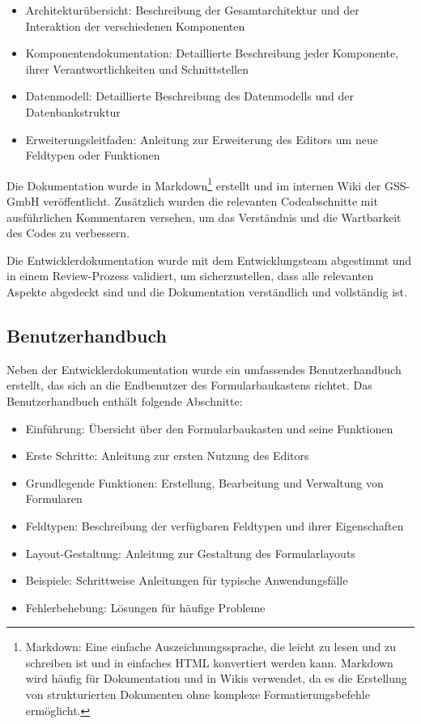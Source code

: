 \documentclass[a4paper,11pt]{article}
\begin{document}
\begin{itemize}
  \item Architekturübersicht: Beschreibung der Gesamtarchitektur und der Interaktion der verschiedenen Komponenten
  \item Komponentendokumentation: Detaillierte Beschreibung jeder Komponente, ihrer Verantwortlichkeiten und Schnittstellen
  \item Datenmodell: Detaillierte Beschreibung des Datenmodells und der Datenbankstruktur
  \item Erweiterungsleitfaden: Anleitung zur Erweiterung des Editors um neue Feldtypen oder Funktionen
\end{itemize}

\noindent Die Dokumentation wurde in Markdown\footnote{Markdown: Eine einfache Auszeichnungssprache, die leicht zu lesen und zu schreiben ist und in einfaches HTML konvertiert werden kann. Markdown wird häufig für Dokumentation und in Wikis verwendet, da es die Erstellung von strukturierten Dokumenten ohne komplexe Formatierungsbefehle ermöglicht.} erstellt und im internen Wiki der GSS-GmbH veröffentlicht. Zusätzlich wurden die relevanten Codeabschnitte mit ausführlichen Kommentaren versehen, um das Verständnis und die Wartbarkeit des Codes zu verbessern.

\noindent Die Entwicklerdokumentation wurde mit dem Entwicklungsteam abgestimmt und in einem Review-Prozess validiert, um sicherzustellen, dass alle relevanten Aspekte abgedeckt sind und die Dokumentation verständlich und vollständig ist.

\subsection{Benutzerhandbuch}
Neben der Entwicklerdokumentation wurde ein umfassendes Benutzerhandbuch erstellt, das sich an die Endbenutzer des Formularbaukastens richtet. Das Benutzerhandbuch enthält folgende Abschnitte:

\begin{itemize}
  \item Einführung: Übersicht über den Formularbaukasten und seine Funktionen
  \item Erste Schritte: Anleitung zur ersten Nutzung des Editors
  \item Grundlegende Funktionen: Erstellung, Bearbeitung und Verwaltung von Formularen
  \item Feldtypen: Beschreibung der verfügbaren Feldtypen und ihrer Eigenschaften
  \item Layout-Gestaltung: Anleitung zur Gestaltung des Formularlayouts
  \item Beispiele: Schrittweise Anleitungen für typische Anwendungsfälle
  \item Fehlerbehebung: Lösungen für häufige Probleme
\end{itemize}
\end{document}
